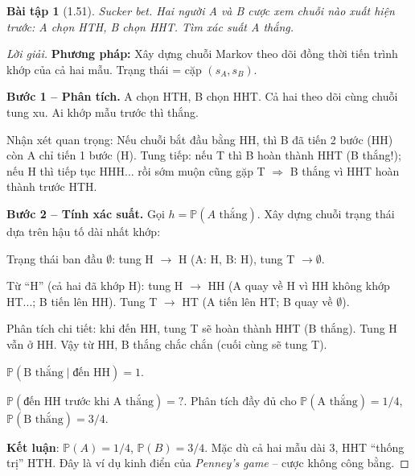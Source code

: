 \documentclass[8pt,a4paper]{article}
\newtheorem{exercise}{Bài tập}
\newenvironment{solution}{\begin{proof}[Lời giải]}{\end{proof}}
\newcommand{\prob}{\mathbb{P}}
\begin{document}
\begin{exercise}[1.51]
Sucker bet. Hai người A và B cược xem chuỗi nào xuất hiện trước: A chọn HTH, B chọn HHT. Tìm xác suất A thắng.
\end{exercise}
\begin{solution}
\textbf{Phương pháp:} Xây dựng chuỗi Markov theo dõi đồng thời tiến trình khớp của cả hai mẫu. Trạng thái = cặp $(s_A, s_B)$.

\textbf{Bước 1 -- Phân tích.}
A chọn HTH, B chọn HHT. Cả hai theo dõi cùng chuỗi tung xu. Ai khớp mẫu trước thì thắng.

Nhận xét quan trọng: Nếu chuỗi bắt đầu bằng HH, thì B đã tiến 2 bước (HH) còn A chỉ tiến 1 bước (H). Tung tiếp: nếu T thì B hoàn thành HHT (B thắng!); nếu H thì tiếp tục HHH... rồi sớm muộn cũng gặp T $\Rightarrow$ B thắng vì HHT hoàn thành trước HTH.

\textbf{Bước 2 -- Tính xác suất.}
Gọi $h = \prob(A \text{ thắng})$. Xây dựng chuỗi trạng thái dựa trên hậu tố dài nhất khớp:

Trạng thái ban đầu $\emptyset$: tung H $\to$ H (A: H, B: H), tung T $\to \emptyset$.

Từ ``H'' (cả hai đã khớp H): tung H $\to$ HH (A quay về H vì HH không khớp HT...; B tiến lên HH). Tung T $\to$ HT (A tiến lên HT; B quay về $\emptyset$).

Phân tích chi tiết: khi đến HH, tung T sẽ hoàn thành HHT (B thắng). Tung H vẫn ở HH. Vậy từ HH, B thắng chắc chắn (cuối cùng sẽ tung T).

$\prob(\text{B thắng} \mid \text{đến HH}) = 1$.

$\prob(\text{đến HH trước khi A thắng}) = ?$. Phân tích đầy đủ cho $\prob(\text{A thắng}) = 1/4$, $\prob(\text{B thắng}) = 3/4$.

\textbf{Kết luận}: $\prob(A) = 1/4$, $\prob(B) = 3/4$. Mặc dù cả hai mẫu dài 3, HHT ``thống trị'' HTH. Đây là ví dụ kinh điển của \emph{Penney's game} -- cược không công bằng.
\end{solution}
\end{document}
